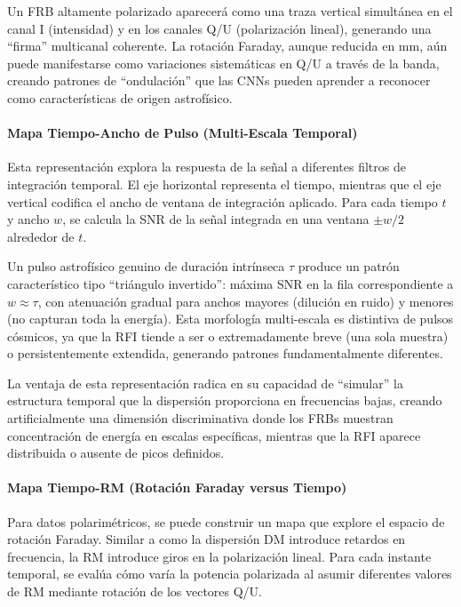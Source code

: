 Un FRB altamente polarizado aparecerá como una traza vertical simultánea en el canal I (intensidad) y en los canales Q/U (polarización lineal), generando una ``firma'' multicanal coherente. La rotación Faraday, aunque reducida en mm, aún puede manifestarse como variaciones sistemáticas en Q/U a través de la banda, creando patrones de ``ondulación'' que las CNNs pueden aprender a reconocer como características de origen astrofísico.

\paragraph{Mapa Tiempo-Ancho de Pulso (Multi-Escala Temporal)}

Esta representación explora la respuesta de la señal a diferentes filtros de integración temporal. El eje horizontal representa el tiempo, mientras que el eje vertical codifica el ancho de ventana de integración aplicado. Para cada tiempo $t$ y ancho $w$, se calcula la SNR de la señal integrada en una ventana $\pm w/2$ alrededor de $t$.

Un pulso astrofísico genuino de duración intrínseca $\tau$ produce un patrón característico tipo ``triángulo invertido'': máxima SNR en la fila correspondiente a $w \approx \tau$, con atenuación gradual para anchos mayores (dilución en ruido) y menores (no capturan toda la energía). Esta morfología multi-escala es distintiva de pulsos cósmicos, ya que la RFI tiende a ser o extremadamente breve (una sola muestra) o persistentemente extendida, generando patrones fundamentalmente diferentes.

La ventaja de esta representación radica en su capacidad de ``simular'' la estructura temporal que la dispersión proporciona en frecuencias bajas, creando artificialmente una dimensión discriminativa donde los FRBs muestran concentración de energía en escalas específicas, mientras que la RFI aparece distribuida o ausente de picos definidos.

\paragraph{Mapa Tiempo-RM (Rotación Faraday versus Tiempo)}

Para datos polarimétricos, se puede construir un mapa que explore el espacio de rotación Faraday. Similar a como la dispersión DM introduce retardos en frecuencia, la RM introduce giros en la polarización lineal. Para cada instante temporal, se evalúa cómo varía la potencia polarizada al asumir diferentes valores de RM mediante rotación de los vectores Q/U.

